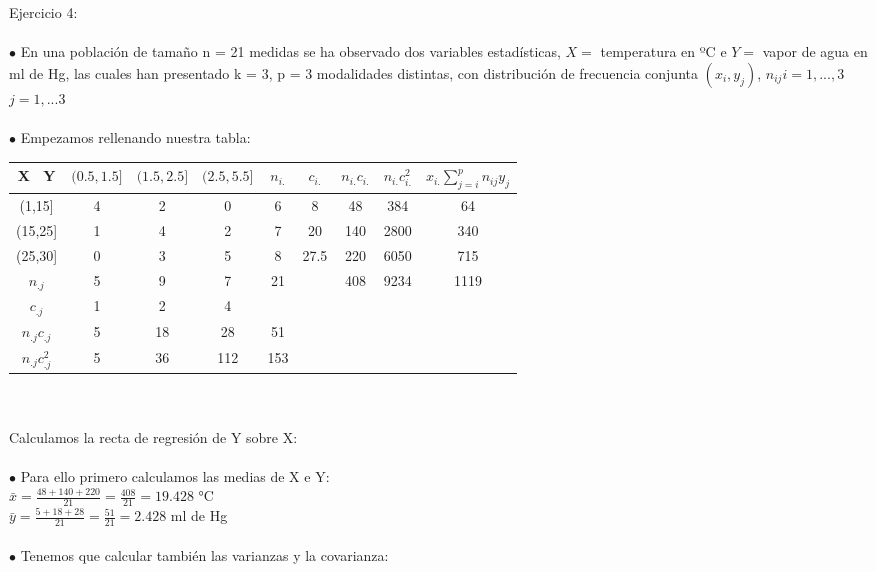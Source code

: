 \documentclass{article}
\begin{document}
		Ejercicio 4: \\ \\
	$\bullet$ En una población de tamaño n = 21 medidas se ha observado dos variables
	estadísticas, $X =$ temperatura en ºC e $Y =$ vapor de agua en ml de Hg, las
	cuales han presentado k = 3, p = 3 modalidades distintas, con distribución de
	frecuencia conjunta $(x_{i},y_{j})$, $n_{ij} i = 1,...,3$ $ j=1,...3$\\ \\
	$\bullet$ Empezamos rellenando nuestra tabla: \\
	
		\begin{tabular}{ | c | c | c | c | c | c | c | c| c| }
		
		
		\hline	
		X \ Y & $(0.5,1.5]$ & $(1.5,2.5]$ & $(2.5,5.5]$ & $n_{i.}$& $c_{i.}$& $n_{i.}c_{i.}$ &  $n_{i.}c_{i.}^{2}$ & $x_{i.}\sum_{j=i}^{p}n_{ij}y_{j}$ \\ \hline
		(1,15] & 4 & 2  & 0 & 6 & 8 & 48& 384 & 64 \\
		(15,25] & 1 & 4 & 2 & 7& 20 & 140 & 2800 & 340 \\
		(25,30] & 0 & 3 & 5 & 8 & 27.5 & 220 & 6050 & 715 \\
		$n_{.j}$& 5 & 9  & 7 & 21 & & 408 & 9234 & 1119 \\ 
		$c_{.j}$& 1 & 2  & 4  &  & & & &\\
		$n_{.j}c_{.j}$ & 5 & 18 & 28 & 51 & & & &  \\
		$n_{.j}c_{.j}^{2}$& 5 & 36 & 112 & 153 & & & & \\\hline
		
		
	\end{tabular}
\\ \\

	Calculamos la recta de regresión de Y sobre X:\\
	\\
	$\bullet$  Para ello primero calculamos las medias de X e Y: \\
	
	$\bar{x} = \frac{48 + 140 + 220}{21} = \frac{408}{21} = 19.428 $ °C
	\\ 
	
		$\bar{y} = \frac{5 + 18 + 28}{21} = \frac{51}{21} = 2.428  $ ml de Hg
		\\
	\\
	
	$\bullet$ Tenemos que calcular también las varianzas y la covarianza: \\
	
\end{document}
